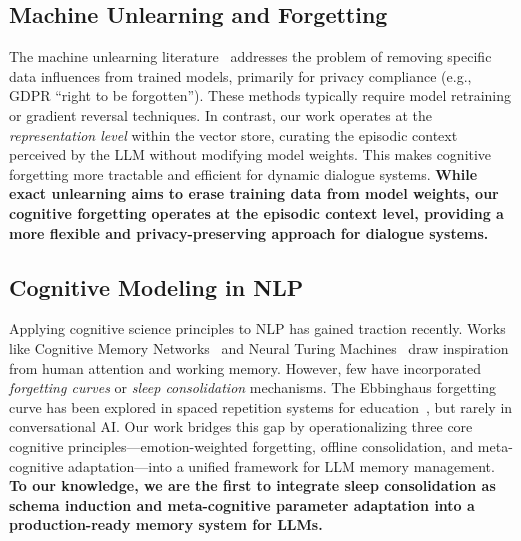 \subsection{Machine Unlearning and Forgetting}
The machine unlearning literature~\cite{sekhar2021unlearning, guo2024unlearning} addresses the problem of removing specific data influences from trained models, primarily for privacy compliance (e.g., GDPR ``right to be forgotten''). These methods typically require model retraining or gradient reversal techniques. In contrast, our work operates at the \textit{representation level} within the vector store, curating the episodic context perceived by the LLM without modifying model weights. This makes cognitive forgetting more tractable and efficient for dynamic dialogue systems. \textbf{While exact unlearning aims to erase training data from model weights, our cognitive forgetting operates at the episodic context level, providing a more flexible and privacy-preserving approach for dialogue systems.}

\subsection{Cognitive Modeling in NLP}
Applying cognitive science principles to NLP has gained traction recently. Works like Cognitive Memory Networks~\cite{cognitive_mem} and Neural Turing Machines~\cite{ntm} draw inspiration from human attention and working memory. However, few have incorporated \textit{forgetting curves} or \textit{sleep consolidation} mechanisms. The Ebbinghaus forgetting curve has been explored in spaced repetition systems for education~\cite{ebbinghaus_app}, but rarely in conversational AI. Our work bridges this gap by operationalizing three core cognitive principles—emotion-weighted forgetting, offline consolidation, and meta-cognitive adaptation—into a unified framework for LLM memory management. \textbf{To our knowledge, we are the first to integrate sleep consolidation as schema induction and meta-cognitive parameter adaptation into a production-ready memory system for LLMs.}
